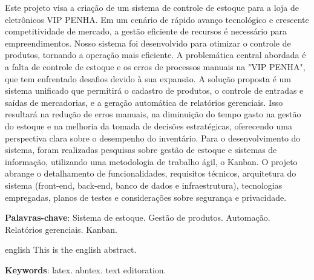 \documentclass[
	12pt,				%
	openany,			%
	twoside,			%
	a4paper,			%
	english,			%
	brazil				%
	]{abntex2}
\newcommand{\listofquadrosname}{Lista de quadros}
\let\cleardoublepage\clearpage
\begin{document}
\setlength{\absparsep}{18pt} %
\begin{resumo}
Este projeto visa a criação de um sistema de controle de estoque para a loja de eletrônicos VIP PENHA. Em um cenário de rápido avanço tecnológico e crescente competitividade de mercado, a gestão eficiente de recursos é necessário para empreendimentos. Nosso sistema foi desenvolvido para otimizar o controle de produtos, tornando a operação mais eficiente.
A problemática central abordada é a falta de controle de estoque e os erros de processos manuais na "VIP PENHA", que tem enfrentado desafios devido à sua expansão. A solução proposta é um sistema unificado que permitirá o cadastro de produtos, o controle de entradas e saídas de mercadorias, e a geração automática de relatórios gerenciais. Isso resultará na redução de erros manuais, na diminuição do tempo gasto na gestão do estoque e na melhoria da tomada de decisões estratégicas, oferecendo uma perspectiva clara sobre o desempenho do inventário.
Para o desenvolvimento do sistema, foram realizadas pesquisas sobre gestão de estoque e sistemas de informação, utilizando uma metodologia de trabalho ágil, o Kanban. O projeto abrange o detalhamento de funcionalidades, requisitos técnicos, arquitetura do sistema (front-end, back-end, banco de dados e infraestrutura), tecnologias empregadas, planos de testes e considerações sobre segurança e privacidade. 

 \textbf{Palavras-chave}: Sistema de estoque. Gestão de produtos. Automação. Relatórios gerenciais. Kanban. 
\end{resumo}

\begin{resumo}[Abstract]
 \begin{otherlanguage*}{english}
   This is the english abstract.

   \vspace{\onelineskip}
 
   \noindent 
   \textbf{Keywords}: latex. abntex. text editoration.
 \end{otherlanguage*}
\end{resumo}



\listoffigures*
\clearpage

\pdfbookmark[0]{\listofquadrosname}{loq}
\listofquadros*
\cleardoublepage
\end{document}
